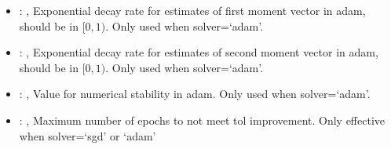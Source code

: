 \begin{itemize}
    \item {}: ,
      Exponential decay rate for estimates of first moment vector in adam, should be in $[0, 1)$.
      Only used when solver=`adam'.

    \item {}: ,
      Exponential decay rate for estimates of second moment vector in adam, should be in $[0, 1)$.
      Only used when solver=`adam'.

    \item {}: ,
      Value for numerical stability in adam. Only used when solver=`adam'.

    \item {}: ,
      Maximum number of epochs to not meet tol improvement. Only effective when
      solver=`sgd' or `adam'
  \end{itemize}


